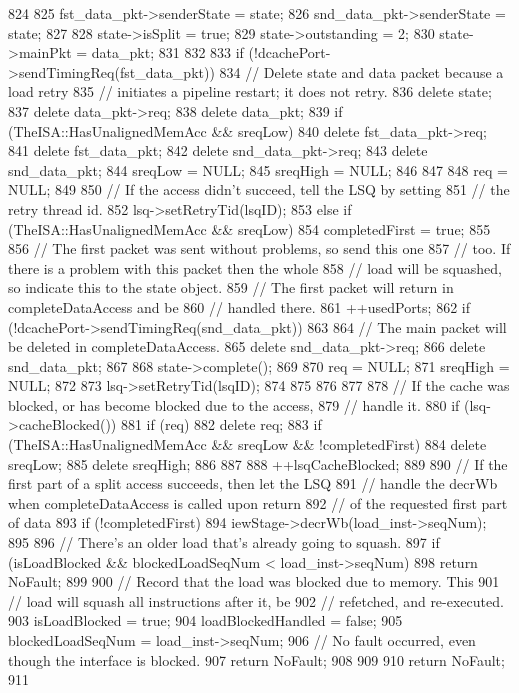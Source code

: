 \begin{DoxyCode}
{{{824 
825             fst_data_pkt->senderState = state;
826             snd_data_pkt->senderState = state;
827 
828             state->isSplit = true;
829             state->outstanding = 2;
830             state->mainPkt = data_pkt;
831         }
832 
833         if (!dcachePort->sendTimingReq(fst_data_pkt)) {
834             // Delete state and data packet because a load retry
835             // initiates a pipeline restart; it does not retry.
836             delete state;
837             delete data_pkt->req;
838             delete data_pkt;
839             if (TheISA::HasUnalignedMemAcc && sreqLow) {
840                 delete fst_data_pkt->req;
841                 delete fst_data_pkt;
842                 delete snd_data_pkt->req;
843                 delete snd_data_pkt;
844                 sreqLow = NULL;
845                 sreqHigh = NULL;
846             }
847 
848             req = NULL;
849 
850             // If the access didn't succeed, tell the LSQ by setting
851             // the retry thread id.
852             lsq->setRetryTid(lsqID);
853         } else if (TheISA::HasUnalignedMemAcc && sreqLow) {
854             completedFirst = true;
855 
856             // The first packet was sent without problems, so send this one
857             // too. If there is a problem with this packet then the whole
858             // load will be squashed, so indicate this to the state object.
859             // The first packet will return in completeDataAccess and be
860             // handled there.
861             ++usedPorts;
862             if (!dcachePort->sendTimingReq(snd_data_pkt)) {
863 
864                 // The main packet will be deleted in completeDataAccess.
865                 delete snd_data_pkt->req;
866                 delete snd_data_pkt;
867 
868                 state->complete();
869 
870                 req = NULL;
871                 sreqHigh = NULL;
872 
873                 lsq->setRetryTid(lsqID);
874             }
875         }
876     }
877 
878     // If the cache was blocked, or has become blocked due to the access,
879     // handle it.
880     if (lsq->cacheBlocked()) {
881         if (req)
882             delete req;
883         if (TheISA::HasUnalignedMemAcc && sreqLow && !completedFirst) {
884             delete sreqLow;
885             delete sreqHigh;
886         }
887 
888         ++lsqCacheBlocked;
889 
890         // If the first part of a split access succeeds, then let the LSQ
891         // handle the decrWb when completeDataAccess is called upon return
892         // of the requested first part of data
893         if (!completedFirst)
894             iewStage->decrWb(load_inst->seqNum);
895 
896         // There's an older load that's already going to squash.
897         if (isLoadBlocked && blockedLoadSeqNum < load_inst->seqNum)
898             return NoFault;
899 
900         // Record that the load was blocked due to memory.  This
901         // load will squash all instructions after it, be
902         // refetched, and re-executed.
903         isLoadBlocked = true;
904         loadBlockedHandled = false;
905         blockedLoadSeqNum = load_inst->seqNum;
906         // No fault occurred, even though the interface is blocked.
907         return NoFault;
908     }
909 
910     return NoFault;
911 }
\end{DoxyCode}
